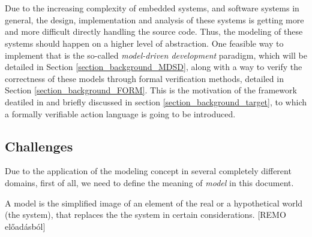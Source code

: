 \chapter{\bevezetes} \label{chapter_intro}

Due to the increasing complexity of embedded systems, and software systems in general, the design, implementation and analysis of these systems is getting more and more difficult directly handling the source code. Thus, the modeling of these systems should happen on a higher level of abstraction. One feasible way to implement that is the so-called \textit{model-driven development} paradigm, which will be detailed in Section \ref{section_background_MDSD}, along with a way to verify the correctness of these models through formal verification methods, detailed in Section \ref{section_background_FORM}. This is the motivation of the framework deatiled in \cite{GammaVince2018} and briefly discussed in section \ref{section_background_target}, to which a formally verifiable action language is going to be introduced.
\section{Challenges} \label{section_intro_challenges}
Due to the application of the modeling concept in several completely different domains, first of all, we need to define the meaning of \textit{model} in this document.
\begin{definition}[Model]
	A model is the simplified image of an element of the real or a hypothetical world (the system), that replaces the the system in certain considerations. [REMO előadásból]
\end{definition}

